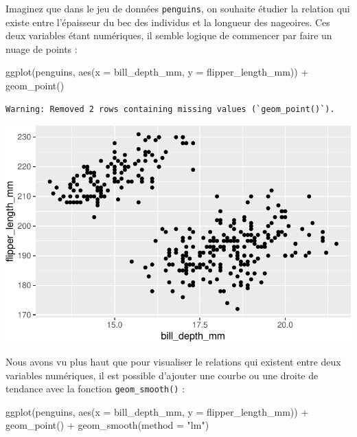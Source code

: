 \documentclass[
  a4paper,
  DIV=11,
  numbers=noendperiod,
  oneside]{scrreprt}
\newenvironment{Shaded}{}{}
\newcommand{\AttributeTok}[1]{\textcolor[rgb]{0.84,0.23,0.29}{#1}}
\newcommand{\FunctionTok}[1]{\textcolor[rgb]{0.44,0.26,0.76}{#1}}
\newcommand{\NormalTok}[1]{\textcolor[rgb]{0.14,0.16,0.18}{#1}}
\newcommand{\SpecialCharTok}[1]{\textcolor[rgb]{0.00,0.36,0.77}{#1}}
\newcommand{\StringTok}[1]{\textcolor[rgb]{0.01,0.18,0.38}{#1}}
\begin{document}
Imaginez que dans le jeu de données \texttt{penguins}, on souhaite
étudier la relation qui existe entre l'épaisseur du bec des individus et
la longueur des nageoires. Ces deux variables étant numériques, il
semble logique de commencer par faire un nuage de points :

\begin{Shaded}
\begin{Highlighting}[]
\FunctionTok{ggplot}\NormalTok{(penguins, }\FunctionTok{aes}\NormalTok{(}\AttributeTok{x =}\NormalTok{ bill\_depth\_mm, }\AttributeTok{y =}\NormalTok{ flipper\_length\_mm)) }\SpecialCharTok{+}
  \FunctionTok{geom\_point}\NormalTok{()}
\end{Highlighting}
\end{Shaded}

\begin{verbatim}
Warning: Removed 2 rows containing missing values (`geom_point()`).
\end{verbatim}

\includegraphics{03-visualization_files/figure-pdf/unnamed-chunk-81-1.pdf}

Nous avons vu plus haut que pour visualiser le relations qui existent
entre deux variables numériques, il est possible d'ajouter une courbe ou
une droite de tendance avec la fonction \texttt{geom\_smooth()} :

\begin{Shaded}
\begin{Highlighting}[]
\FunctionTok{ggplot}\NormalTok{(penguins, }\FunctionTok{aes}\NormalTok{(}\AttributeTok{x =}\NormalTok{ bill\_depth\_mm, }\AttributeTok{y =}\NormalTok{ flipper\_length\_mm)) }\SpecialCharTok{+}
  \FunctionTok{geom\_point}\NormalTok{() }\SpecialCharTok{+}
  \FunctionTok{geom\_smooth}\NormalTok{(}\AttributeTok{method =} \StringTok{"lm"}\NormalTok{)}
\end{Highlighting}
\end{Shaded}
\end{document}
